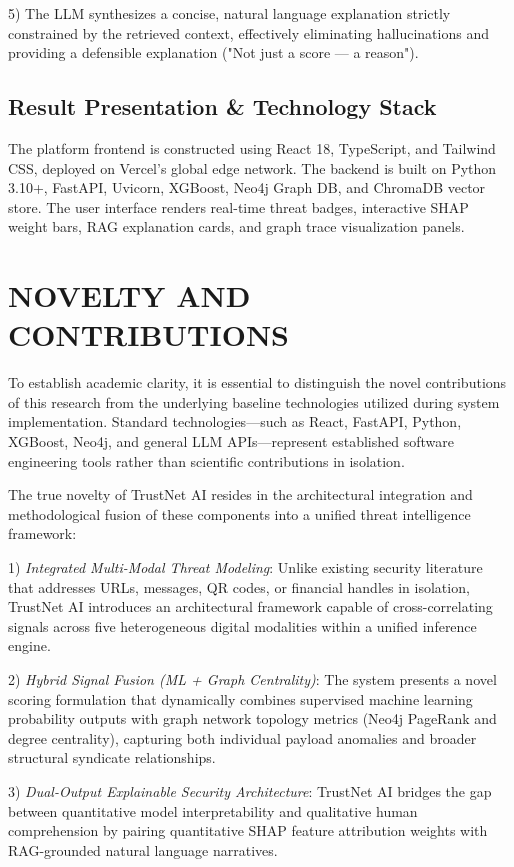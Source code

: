 \documentclass[conference,a4paper]{IEEEtran}
\begin{document}
5) The LLM synthesizes a concise, natural language explanation strictly constrained by the retrieved context, effectively eliminating hallucinations and providing a defensible explanation ("Not just a score — a reason").

\subsection{Result Presentation \& Technology Stack}
The platform frontend is constructed using React 18, TypeScript, and Tailwind CSS, deployed on Vercel's global edge network. The backend is built on Python 3.10+, FastAPI, Uvicorn, XGBoost, Neo4j Graph DB, and ChromaDB vector store. The user interface renders real-time threat badges, interactive SHAP weight bars, RAG explanation cards, and graph trace visualization panels.

\section{NOVELTY AND CONTRIBUTIONS}
To establish academic clarity, it is essential to distinguish the novel contributions of this research from the underlying baseline technologies utilized during system implementation. Standard technologies—such as React, FastAPI, Python, XGBoost, Neo4j, and general LLM APIs—represent established software engineering tools rather than scientific contributions in isolation.

The true novelty of TrustNet AI resides in the architectural integration and methodological fusion of these components into a unified threat intelligence framework:

1) \textit{Integrated Multi-Modal Threat Modeling}: Unlike existing security literature that addresses URLs, messages, QR codes, or financial handles in isolation, TrustNet AI introduces an architectural framework capable of cross-correlating signals across five heterogeneous digital modalities within a unified inference engine.

2) \textit{Hybrid Signal Fusion (ML + Graph Centrality)}: The system presents a novel scoring formulation that dynamically combines supervised machine learning probability outputs with graph network topology metrics (Neo4j PageRank and degree centrality), capturing both individual payload anomalies and broader structural syndicate relationships.

3) \textit{Dual-Output Explainable Security Architecture}: TrustNet AI bridges the gap between quantitative model interpretability and qualitative human comprehension by pairing quantitative SHAP feature attribution weights with RAG-grounded natural language narratives.
\end{document}

